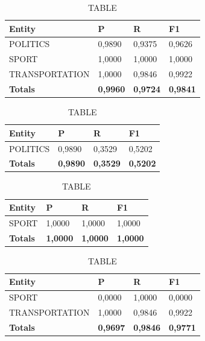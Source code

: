 \documentclass[thesis=M,english]{FITthesis}[2018/05/30]
\begin{document}
	\begin{table}[H]\centering
		\caption{TABLE}
		\label{}
		\begin{tabular}{|l|l|l|l|}
			\hline {\textbf{Entity}} & {\textbf{P}} & {\textbf{R}} & {\textbf{F1}}\\\hline
				POLITICS & 0,9890 & 0,9375 & 0,9626\\
				SPORT & 1,0000 & 1,0000 & 1,0000\\
				TRANSPORTATION & 1,0000 & 0,9846 & 0,9922\\\hline
				\textbf{Totals} & \textbf{0,9960} & \textbf{0,9724} & \textbf{0,9841}\\\hline
		\end{tabular}
	\end{table}

	\begin{table}[H]\centering
		\caption{TABLE}
		\label{}
		\begin{tabular}{|l|l|l|l|}
			\hline {\textbf{Entity}} & {\textbf{P}} & {\textbf{R}} & {\textbf{F1}}\\\hline
				POLITICS & 0,9890 & 0,3529 & 0,5202\\\hline
				\textbf{Totals} & \textbf{0,9890} & \textbf{0,3529} & \textbf{0,5202}\\\hline
		\end{tabular}
	\end{table}

	\begin{table}[H]\centering
		\caption{TABLE}
		\label{}
		\begin{tabular}{|l|l|l|l|}
			\hline {\textbf{Entity}} & {\textbf{P}} & {\textbf{R}} & {\textbf{F1}}\\\hline
				SPORT & 1,0000 & 1,0000 & 1,0000\\\hline
				\textbf{Totals} & \textbf{1,0000} & \textbf{1,0000} & \textbf{1,0000}\\\hline
		\end{tabular}
	\end{table}	

	\begin{table}[H]\centering
		\caption{TABLE}
		\label{}
		\begin{tabular}{|l|l|l|l|}
			\hline {\textbf{Entity}} & {\textbf{P}} & {\textbf{R}} & {\textbf{F1}}\\\hline
				SPORT & 0,0000 & 1,0000 & 0,0000\\
				TRANSPORTATION & 1,0000 & 0,9846 & 0,9922\\\hline
				\textbf{Totals} & \textbf{0,9697} & \textbf{0,9846} & \textbf{0,9771}\\\hline
		\end{tabular}
	\end{table}	
		
\end{document}
